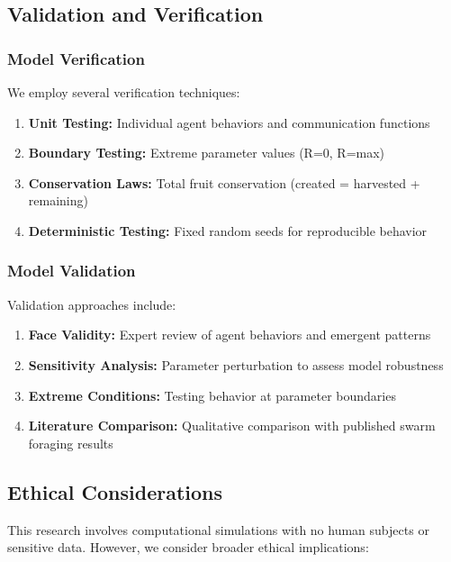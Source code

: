 \documentclass[12pt,a4paper]{article}
\begin{document}
\subsection{Validation and Verification}

\subsubsection{Model Verification}

We employ several verification techniques:

\begin{enumerate}
    \item \textbf{Unit Testing:} Individual agent behaviors and communication functions
    \item \textbf{Boundary Testing:} Extreme parameter values (R=0, R=max)
    \item \textbf{Conservation Laws:} Total fruit conservation (created = harvested + remaining)
    \item \textbf{Deterministic Testing:} Fixed random seeds for reproducible behavior
\end{enumerate}

\subsubsection{Model Validation}

Validation approaches include:

\begin{enumerate}
    \item \textbf{Face Validity:} Expert review of agent behaviors and emergent patterns
    \item \textbf{Sensitivity Analysis:} Parameter perturbation to assess model robustness
    \item \textbf{Extreme Conditions:} Testing behavior at parameter boundaries
    \item \textbf{Literature Comparison:} Qualitative comparison with published swarm foraging results
\end{enumerate}

\subsection{Ethical Considerations}

This research involves computational simulations with no human subjects or sensitive data. However, we consider broader ethical implications:
\end{document}
